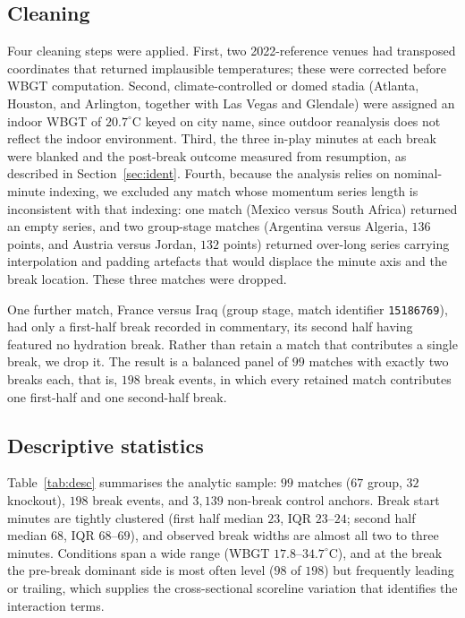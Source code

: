 \documentclass[11pt]{article}
\begin{document}
\subsection{Cleaning}

Four cleaning steps were applied. First, two 2022-reference venues had transposed coordinates that returned
implausible temperatures; these were corrected before WBGT computation. Second, climate-controlled or domed
stadia (Atlanta, Houston, and Arlington, together with Las Vegas and Glendale) were assigned an indoor WBGT of
$20.7^\circ$C keyed on city name, since outdoor reanalysis does not reflect the indoor environment. Third, the
three in-play minutes at each break were blanked and the post-break outcome measured from resumption, as
described in Section~\ref{sec:ident}. Fourth, because the analysis relies on nominal-minute indexing, we
excluded any match whose momentum series length is inconsistent with that indexing: one match (Mexico versus
South Africa) returned an empty series, and two group-stage matches (Argentina versus Algeria, $136$ points,
and Austria versus Jordan, $132$ points) returned over-long series carrying interpolation and padding
artefacts that would displace the minute axis and the break location. These three matches were dropped.

One further match, France versus Iraq (group stage, match identifier \texttt{15186769}), had only a
first-half break recorded in commentary, its second half having featured no hydration break. Rather than
retain a match that contributes a single break, we drop it. The result is a balanced panel of $99$ matches
with exactly two breaks each, that is, $198$ break events, in which every retained match contributes one
first-half and one second-half break.

\subsection{Descriptive statistics}

Table~\ref{tab:desc} summarises the analytic sample: $99$ matches ($67$ group, $32$ knockout), $198$ break
events, and $3{,}139$ non-break control anchors. Break start minutes are tightly clustered (first half median
$23$, IQR $23$--$24$; second half median $68$, IQR $68$--$69$), and observed break widths are almost all two
to three minutes. Conditions span a wide range (WBGT $17.8$--$34.7^\circ$C), and at the break the pre-break
dominant side is most often level ($98$ of $198$) but frequently leading or trailing, which supplies the
cross-sectional scoreline variation that identifies the interaction terms.
\end{document}

